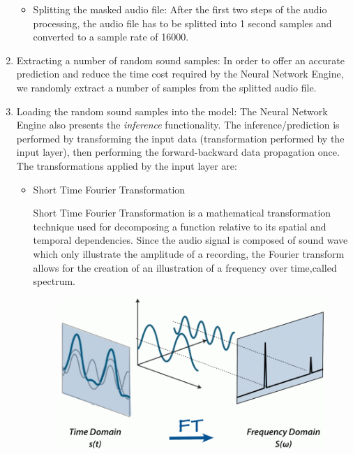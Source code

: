 \begin{enumerate}
\begin{itemize}
			\item Splitting the masked audio file: After the first two steps of the audio processing,
	the audio file has to be splitted into 1 second samples and converted to a sample rate of 16000.
		\end{itemize}

	\item Extracting a number of random sound samples: In order to offer an accurate prediction and reduce the
	time cost required by the Neural Network Engine, we randomly extract a number of samples from the splitted audio
	file.
\item Loading the random sound samples into the model: The Neural Network Engine also presents the \textit{inference}
	functionality. The inference/prediction is performed by transforming the input data (transformation performed
	by the input layer), then performing the forward-backward data propagation once.
	The transformations applied by the input layer are:
	\begin{itemize}

		\item Short Time Fourier Transformation

		Short Time Fourier Transformation is a mathematical transformation technique used for
		decomposing a function relative to its spatial and temporal dependencies. Since the audio signal is
		composed of sound wave which only illustrate the amplitude of
		a recording, the Fourier transform allows for the creation of an illustration of a frequency
		over time,called spectrum. \cite{ft}

			\begin{figure}
				\centering
				\includegraphics[width = 4.5in]{images/ft.png}
			\centerline{}
			\label{ft}
			\end{figure}



\end{itemize}
\end{enumerate}
